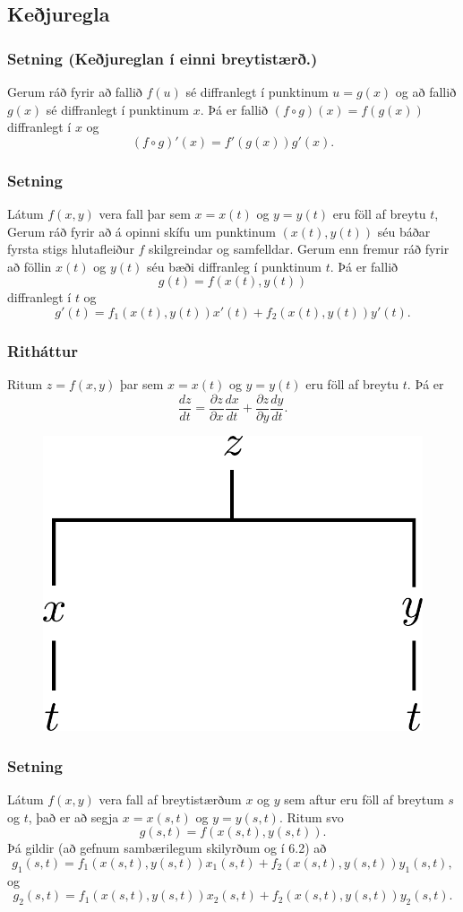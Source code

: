  


\subsection{Keðjuregla} 

\subsubsection{Setning  (Keðjureglan í einni breytistærð.)}
 Gerum ráð fyrir að fallið $f(u)$ sé diffranlegt í punktinum $u=g(x)$ og að fallið $g(x)$ sé diffranlegt í punktinum $x$.  Þá er fallið $(f\circ g)(x)=f(g(x))$ diffranlegt í $x$ og 
$$(f\circ g)'(x)=f'(g(x))g'(x).$$


\subsubsection{Setning }
Látum $f(x,y)$ vera fall þar sem $x=x(t)$ og $y=y(t)$ eru föll af breytu $t$,  Gerum ráð fyrir að á opinni skífu um  punktinum $(x(t),y(t))$ séu báðar fyrsta stigs hlutafleiður $f$ skilgreindar og samfelldar.   Gerum enn fremur ráð fyrir að föllin $x(t)$ og $y(t)$ séu bæði diffranleg í punktinum $t$.  Þá er fallið 
$$g(t)=f(x(t),y(t))$$
diffranlegt í $t$ og 
$$g'(t)=f_1(x(t),y(t))x'(t)+f_2(x(t),y(t))y'(t).$$



\subsubsection{Ritháttur }

Ritum $z=f(x,y)$ þar sem $x=x(t)$ og $y=y(t)$ eru föll af breytu $t$.  Þá er 
$$\frac{dz}{dt}=\frac{\partial z}{\partial x}\frac{dx}{dt}
+\frac{\partial z}{\partial y}\frac{dy}{dt}.$$

 \begin{figure}[h!]
           \centering
            \includegraphics[width=0.3\linewidth]{chain1}
	\caption*{}
    \end{figure}


\subsubsection{Setning }
 Látum $f(x,y)$ vera fall af breytistærðum $x$ og $y$ sem aftur eru föll af breytum $s$ og $t$, það er að segja 
$x=x(s,t)$ og $y=y(s,t)$.  Ritum svo 
$$g(s,t)=f(x(s,t),y(s,t)).$$
Þá gildir (að gefnum sambærilegum skilyrðum og í 6.2) að
$$g_1(s,t)=f_1(x(s,t),y(s,t))x_1(s,t)+f_2(x(s,t),y(s,t))y_1(s,t),$$
og 
$$g_2(s,t)=f_1(x(s,t),y(s,t))x_2(s,t)+f_2(x(s,t),y(s,t))y_2(s,t).$$



